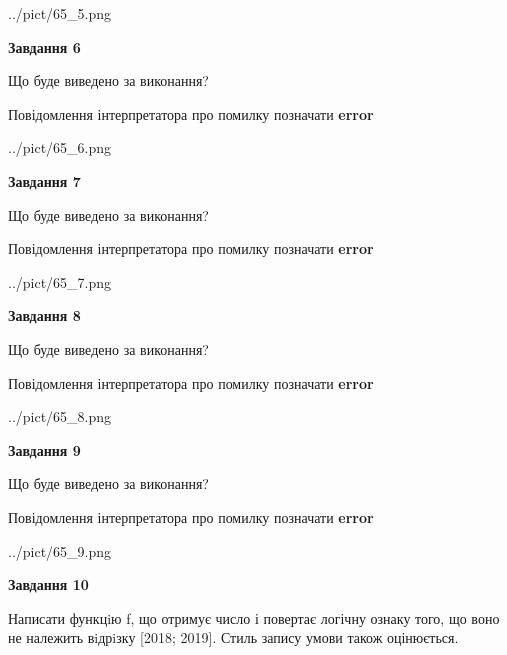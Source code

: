 \documentclass[12pt, ukrainian]{article}
\begin{document}
{\begin {large}
\begin{center}
	{../pict/65_5.png}
\end{center}
\newpage

{\begin {center}\textbf{Завдання 6}\end {center}}\par
Що буде виведено за виконання? \par
Повідомлення інтерпретатора про помилку позначати \textbf{error}

\begin{center}
	{../pict/65_6.png}
\end{center}
\newpage

{\begin {center}\textbf{Завдання 7}\end {center}}\par
Що буде виведено за виконання? \par
Повідомлення інтерпретатора про помилку позначати \textbf{error}

\begin{center}
	{../pict/65_7.png}
\end{center}
\newpage

{\begin {center}\textbf{Завдання 8}\end {center}}\par
Що буде виведено за виконання? \par
Повідомлення інтерпретатора про помилку позначати \textbf{error}

\begin{center}
	{../pict/65_8.png}
\end{center}
\newpage

{\begin {center}\textbf{Завдання 9}\end {center}}\par
Що буде виведено за виконання? \par
Повідомлення інтерпретатора про помилку позначати \textbf{error}

\begin{center}
	{../pict/65_9.png}
\end{center}
\newpage

{\begin {center}\textbf{Завдання 10}\end {center}}\par

Написати функцiю f, що отримує число і повертає логічну ознаку того, що воно не належить вiдрiзку [2018; 2019]. Стиль запису умови також оцінюється.\par
\newpage

\end {large}}
\end{document}
